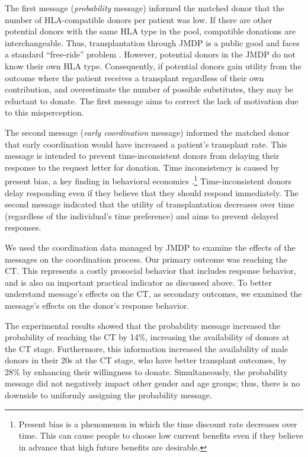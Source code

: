 \documentclass[12pt, a4paper]{article}
\begin{document}
The first message (\emph{probability} message) informed the matched donor that the number of HLA-compatible donors per patient was low. If there are other potential donors with the same HLA type in the pool, compatible donations are interchangeable. Thus, transplantation through JMDP is a public good and faces a standard ``free-ride'' problem \citep{Bergstrom2009}. However, potential donors in the JMDP do not know their own HLA type. Consequently, if potential donors gain utility from the outcome where the patient receives a transplant regardless of their own contribution, and overestimate the number of possible substitutes, they may be reluctant to donate. The first message aims to correct the lack of motivation due to this misperception.

The second message (\emph{early coordination} message) informed the matched donor that early coordination would have increased a patient's transplant rate. This message is intended to prevent time-inconsistent donors from delaying their response to the request letter for donation. Time inconsistency is caused by present bias, a key finding in behavioral economics \citep{Laibson1997, ODonoghue2001}.\footnote{Present bias is a phenomenon in which the time discount rate decreases over time. This can cause people to choose low current benefits even if they believe in advance that high future benefits are desirable.} Time-inconsistent donors delay responding even if they believe that they should respond immediately. The second message indicated that the utility of transplantation decreases over time (regardless of the individual's time preference) and aims to prevent delayed responses.

We used the coordination data managed by JMDP to examine the effects of the messages on the coordination process. Our primary outcome was reaching the CT. This represents a costly prosocial behavior that includes response behavior, and is also an important practical indicator as discussed above. To better understand message's effects on the CT, as secondary outcomes, we examined the message's effects on the donor's response behavior.

The experimental results showed that the probability message increased the probability of reaching the CT by 14\%, increasing the availability of donors at the CT stage. Furthermore, this information increased the availability of male donors in their 20s at the CT stage, who have better transplant outcomes, by 28\% by enhancing their willingness to donate. Simultaneously, the probability message did not negatively impact other gender and age groups; thus, there is no downside to uniformly assigning the probability message.
\end{document}
